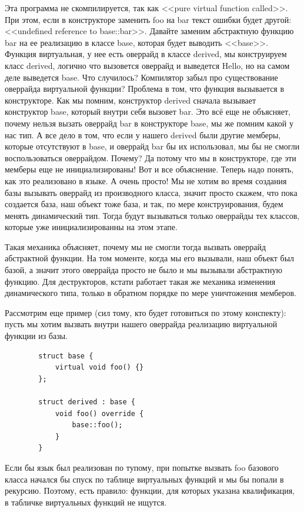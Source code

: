 \documentclass[12pt, a4paper]{article}
\begin{document}
	Эта программа не скомпилируется, так как <<pure virtual function called>>. При этом, если в конструкторе заменить foo на bar текст ошибки будет другой: <<undefined reference to base::bar>>. Давайте заменим абстрактную функцию bar на ее реализацию в классе base, которая будет выводить <<base>>. Функция виртуальная, у нее есть оверрайд в классе derived, мы конструируем класс derived, логично что вызовется оверрайд и выведется Hello, но на самом деле выведется base. Что случилось? Компилятор забыл про существование оверрайда виртуальной функции? Проблема в том, что функция вызывается в конструкторе. Как мы помним, конструктор derived сначала вызывает конструктор base, который внутри себя вызовет bar. Это всё еще не объясняет, почему нельзя вызать оверрайд bar в конструкторе base, мы же помним какой у нас тип. А все дело в том, что если у нашего derived были другие мемберы, которые отсутствуют в base, и оверрайд bar бы их использовал, мы бы не смогли воспользоваться оверрайдом. Почему? Да потому что мы в конструкторе, где эти мемберы еще не инициализированы! Вот и все объяснение. Теперь надо понять, как это реализовано в языке. А очень просто! Мы не хотим во время создания базы вызывать оверрайд из производного класса, значит просто скажем, что пока создается база, наш объект тоже база, и так, по мере конструирования, будем менять динамический тип. Тогда будут вызываться только оверрайды тех классов, которые уже инициализированны на этом этапе.
	\par Такая механика объясняет, почему мы не смогли тогда вызвать оверрайд абстрактной функции. На том моменте, когда мы его вызывали, наш объект был базой, а значит этого оверрайда просто не было и мы вызывали абстрактную функцию. Для деструкторов, кстати работает такая же механика изменения динамического типа, только в обратном порядке по мере уничтожения мемберов.
	\\\par Рассмотрим еще пример (сил тому, кто будет готовиться по этому конспекту): пусть мы хотим вызвать внутри нашего оверрайда реализацию виртуальной функции из базы.
	\begin{verbatim}
		struct base {
			virtual void foo() {}
		};
		
		struct derived : base {
			void foo() override {
				base::foo();
			}
		}
	\end{verbatim}
	Если бы язык был реализован по тупому, при попытке вызвать foo базового класса начался бы спуск по таблице виртуальных функций и мы бы попали в рекурсию. Поэтому, есть правило: функции, для которых указана квалификация, в табличке виртуальных функций не ищутся.\\
\end{document}
